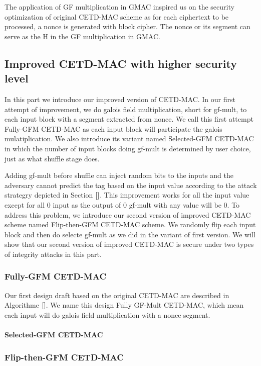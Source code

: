 The application of GF multiplication in GMAC inspired us on the security
optimization of original CETD-MAC scheme as for each ciphertext to be processed,
a nonce is generated with block cipher. The nonce or its segment can serve as
the H in the GF multiplication in GMAC. 
\subsection{Improved CETD-MAC with higher security level}
In this part we introduce our improved version of CETD-MAC. In our first attempt
of improvement, we do galois field multiplication, short for gf-mult, to each input block with a
segment extracted from nonce. We call this first attempt Fully-GFM CETD-MAC as
each input block will participate the galois mulatiplication. We also introduce
its variant named Selected-GFM CETD-MAC in which the number of input blocks
doing gf-mult is determined by user choice, just as what shuffle stage does. 

Adding gf-mult before shuffle can inject random bits to the inputs and the
adversary cannot predict the tag based on the input value according to the
attack strategry depicted in Section $\ref{}$. This improvement works for all
the input value except for all 0 input as the output of 0 gf-mult with any value
will be 0. To address this problem, we introduce our second version of improved
CETD-MAC scheme named Flip-then-GFM CETD-MAC scheme. We randomly flip each input
block and then do selecte gf-mult as we did in the variant of first version. We
will show that our second version of improved CETD-MAC is secure under two types
of integrity attacks in this part. 
\subsubsection{Fully-GFM CETD-MAC}
Our first design draft based on the original CETD-MAC are described in
Algorithme $\ref{}$. We name this design Fully GF-Mult CETD-MAC, which mean each
input will do galois field multiplication with a nonce segment.  
\paragraph{}
\paragraph{Selected-GFM CETD-MAC}

\subsubsection{Flip-then-GFM CETD-MAC}

